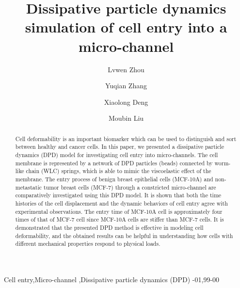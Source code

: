 \documentclass[review]{elsarticle}
\begin{document}
\begin{frontmatter}
\title{Dissipative particle dynamics simulation of cell entry into a micro-channel}

\author[zhou]{Lvwen Zhou}
\address[zhou]{Institute of Mechanics, Chinese Academy of Sciences, Beijing 100190, China}

\author[Zhang]{Yuqian Zhang}
\address[Zhang]{Cancer Institute \& Hostptial, Chinese Academy of Medical Sciences, Beijing 100021, China}

\author[Deng]{Xiaolong Deng}
\address[Deng]{Beijing Computational Science Research Center, Beijing 100084, China}

\author[Liu]{Moubin Liu}
\address[Liu]{College of Engineering, Peking University, Beijing 100871, China}

\begin{abstract}
Cell deformability is an important biomarker which can be used to distinguish and sort between healthy and cancer cells. In this paper, we presented a dissipative particle dynamics (DPD) model for investigating cell entry into micro-channels. The cell membrane is represented by a network of DPD particles (beads) connected by worm-like chain (WLC) springs, which is able to mimic the viscoelastic effect of the membrane.  The entry process of benign breast epithelial cells (MCF-10A) and non-metastatic tumor breast cells (MCF-7) through a constricted micro-channel are comparatively investigated using this DPD model.  It is shown that both the time histories of the cell displacement and the dynamic behaviors of cell entry agree with experimental observations. The entry time of MCF-10A cell is approximately four times of that of MCF-7 cell since MCF-10A cells are stiffer than MCF-7 cells.  It is demonstrated that the presented DPD method is effective in modeling cell deformability, and the obtained results can be helpful in understanding how cells with different mechanical properties respond to physical loads.
\end{abstract}

\begin{keyword}
Cell entry\sep Micro-channel \sep Dissipative particle dynamics (DPD)
-01\sep  99-00
\end{keyword}

\end{frontmatter}
\end{document}
